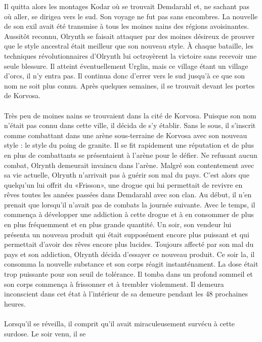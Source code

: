 \documentclass[main.tex]{subfiles}
\begin{document}
    Il quitta alors les montages Kodar où se trouvait Demdarahl et, ne sachant pas où aller, se dirigea vers
    le sud. Son voyage ne fut pas sans encombres. La nouvelle de son exil avait été transmise à tous les moines
    nains des régions avoisinantes. Aussitôt reconnu, Olrynth se faisait attaquer par des moines désireux de
    prouver que le style ancestral était meilleur que son nouveau style. À chaque bataille, les techniques
    révolutionnaires d'Olrynth lui octroyèrent la victoire sans recevoir une seule blessure. Il atteint
    éventuellement Urglin, mais ce village étant un village d'orcs, il n'y entra pas. Il continua donc d'errer
    vers le sud jusqu'à ce que son nom ne soit plus connu. Après quelques semaines, il se trouvait devant les
    portes de Korvosa.\\
    \\
    Très peu de moines nains se trouvaient dans la cité de Korvosa. Puisque son nom n'était pas connu dans cette
    ville, il décida de s'y établir. Sans le sous, il s'inscrit comme combattant dans une arène sous-terraine de
    Korvosa avec son nouveau style : le style du poing de granite. Il se fit rapidement une réputation et de
    plus en plus de combattants se présentaient à l'arène pour le défier. Ne refusant aucun combat, Olrynth
    demeurait invaincu dans l'arène. Malgré son contentement avec sa vie actuelle, Olrynth n'arrivait pas à
    guérir son mal du pays. C'est alors que quelqu'un lui offrit du «Frisson», une drogue qui lui permettait de
    revivre en rêves toutes les années passées dans Demdarahl avec son clan. Au début, il n'en prenait que
    lorsqu'il n'avait pas de combats la journée suivante. Avec le temps, il commença à développer une addiction
    à cette drogue et à en consommer de plus en plus fréquemment et en plus grande quantité. Un soir, son 
    vendeur lui présenta un nouveau produit qui était supposément encore plus puissant et qui permettait 
    d'avoir des rêves encore plus lucides. Toujours affecté par son mal du pays et son addiction, Olrynth décida
    d'essayer ce nouveau produit. Ce soir la, il consomma la nouvelle substance et son corps réagit 
    instanténament. La dose était trop puissante pour son seuil de tolérance. Il tomba dans un profond sommeil 
    et son corps commença à frissonner et à trembler violemment. Il demeura inconscient dans cet état à 
    l'intérieur de sa demeure pendant les 48 prochaines heures.\\
    \\
    Lorsqu'il se réveilla, il comprit qu'il avait miraculeusement survécu à cette surdose. Le soir venu, il se
\end{document}

